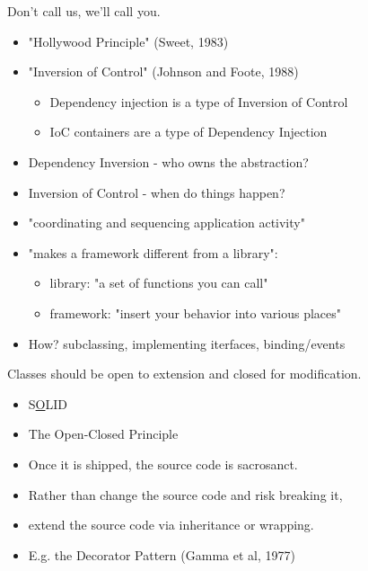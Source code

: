 \documentclass{beamer}
\begin{document}
\begin{frame}{Don't call us, we'll call you.}
    \begin{itemize}
        \item "Hollywood Principle" (Sweet, 1983)
        \item "Inversion of Control" (Johnson and Foote, 1988)
            \begin{itemize}
                \item Dependency injection is a type of Inversion of Control
                \item IoC containers are a type of Dependency Injection
            \end{itemize}
        \item Dependency Inversion - who owns the abstraction?
        \item Inversion of Control - when do things happen?
        \item "coordinating and sequencing application activity"         
        \item "makes a framework different from a library":
            \begin{itemize}
                \item library: "a set of functions you can call"
                \item framework: "insert your behavior into various places"
            \end{itemize}
        \item How? subclassing, implementing iterfaces, binding/events
    \end{itemize}
\end{frame}

\begin{frame}{Classes should be open to extension and closed for modification.}
    \begin{itemize}
        \item S\underline{O}LID %
        \item The Open-Closed Principle
        \item Once it is shipped, the source code is sacrosanct.
        \item Rather than change the source code and risk breaking it, 
        \item extend the source code via inheritance or wrapping. 
        \item E.g. the Decorator Pattern (Gamma et al, 1977)
    \end{itemize}
\end{frame}
\end{document}
